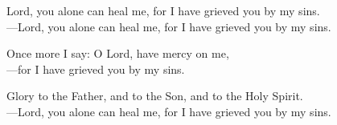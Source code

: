 \responsory

\noindent Lord, you alone can heal me, for I have grieved you by my sins.\\
{\color{red}---\thinspace}Lord, you alone can heal me, for I have grieved you by my sins.

\medskip\noindent Once more I say: O Lord, have mercy on me,\\
{\color{red}---\thinspace}for I have grieved you by my sins.

\medskip\noindent Glory to the Father, and to the Son, and to the Holy Spirit.\\
{\color{red}---\thinspace}Lord, you alone can heal me, for I have grieved you by my sins.